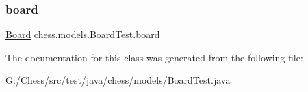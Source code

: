 \subsubsection{\texorpdfstring{board}{board}}
{\footnotesize\ttfamily \mbox{\hyperlink{classchess_1_1models_1_1_board}{Board}} chess.\+models.\+Board\+Test.\+board\hspace{0.3cm}{\ttfamily [private]}}



The documentation for this class was generated from the following file\+:\begin{DoxyCompactItemize}
\item 
G\+:/\+Chess/src/test/java/chess/models/\mbox{\hyperlink{_board_test_8java}{Board\+Test.\+java}}\end{DoxyCompactItemize}
